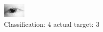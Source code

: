\begin{figure}[h!]
\begin{center}
\includegraphics[width=0.60\columnwidth]{figures/ID114_class_4_target_3.png}
\end{center}
\caption{ Classification: 4 actual target: 3}
\label{fig:ID114_class_4_target_3}
\end{figure}
